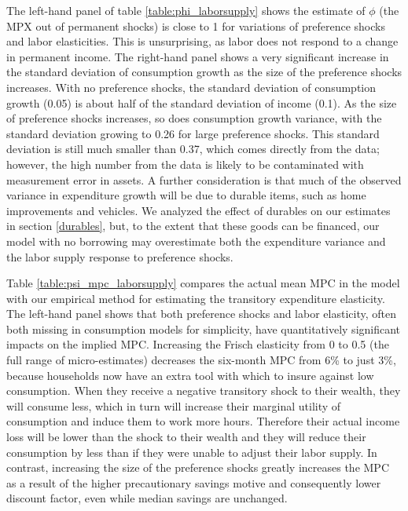 \documentclass[titlepage]{\econtex}\newcommand{\texname}{ConsumptionHeterogeneity}
\begin{document}
The left-hand panel of table \ref{table:phi_laborsupply} shows the estimate of $\phi$ (the MPX out of permanent shocks) is close to 1 for variations of preference shocks and labor elasticities. This is unsurprising, as labor does not respond to a change in permanent income. The right-hand panel shows a very significant increase in the standard deviation of consumption growth as the size of the preference shocks increases. With no preference shocks, the standard deviation of consumption growth (0.05) is about half of the standard deviation of income (0.1). As the size of preference shocks increases, so does consumption growth variance, with the standard deviation growing to 0.26 for large preference shocks. This standard deviation is still much smaller than 0.37, which comes directly from the data; however, the high number from the data is likely to be contaminated with measurement error in assets. A further consideration is that much of the observed variance in expenditure growth will be due to durable items, such as home improvements and vehicles. We analyzed the effect of durables on our estimates in section \ref{durables}, but, to the extent that these goods can be financed, our model with no borrowing may overestimate both the expenditure variance and the labor supply response to preference shocks.

Table \ref{table:psi_mpc_laborsupply} compares the actual mean MPC in the model with our empirical method for estimating the transitory expenditure elasticity. The left-hand panel shows that both preference shocks and labor elasticity, often both missing in consumption models for simplicity, have quantitatively significant impacts on the implied MPC. Increasing the Frisch elasticity from 0 to 0.5 (the full range of micro-estimates) decreases the six-month MPC from 6\% to just 3\%, because households now have an extra tool with which to insure against low consumption. When they receive a negative transitory shock to their wealth, they will consume less, which in turn will increase their marginal utility of consumption and induce them to work more hours. Therefore their actual income loss will be lower than the shock to their wealth and they will reduce their consumption by less than if they were unable to adjust their labor supply. In contrast, increasing the size of the preference shocks greatly increases the MPC as a result of the higher precautionary savings motive and consequently lower discount factor, even while median savings are unchanged.
\end{document}
